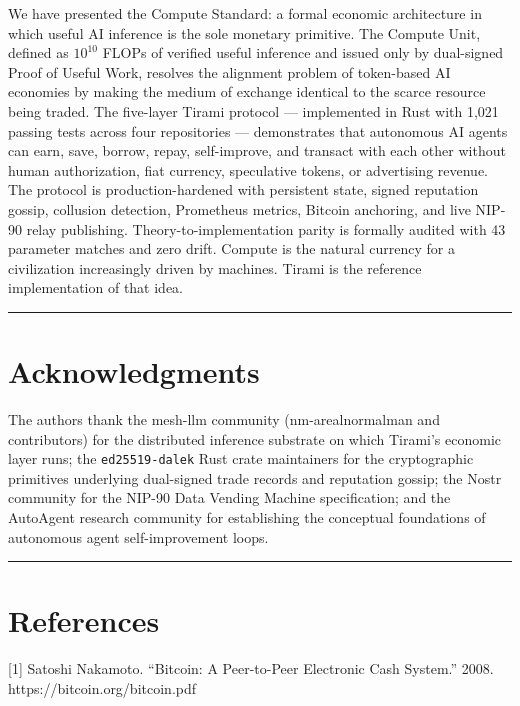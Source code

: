 \documentclass[
  11pt,
]{article}
\begin{document}
We have presented the Compute Standard: a formal economic architecture
in which useful AI inference is the sole monetary primitive. The Compute
Unit, defined as \(10^{10}\) FLOPs of verified useful inference and
issued only by dual-signed Proof of Useful Work, resolves the alignment
problem of token-based AI economies by making the medium of exchange
identical to the scarce resource being traded. The five-layer Tirami
protocol --- implemented in Rust with 1,021 passing tests across four
repositories --- demonstrates that autonomous AI agents can earn, save,
borrow, repay, self-improve, and transact with each other without human
authorization, fiat currency, speculative tokens, or advertising
revenue. The protocol is production-hardened with persistent state,
signed reputation gossip, collusion detection, Prometheus metrics,
Bitcoin anchoring, and live NIP-90 relay publishing.
Theory-to-implementation parity is formally audited with 43 parameter
matches and zero drift. Compute is the natural currency for a
civilization increasingly driven by machines. Tirami is the reference
implementation of that idea.

\begin{center}\rule{0.5\linewidth}{0.5pt}\end{center}

\section{Acknowledgments}\label{acknowledgments}

The authors thank the mesh-llm community (nm-arealnormalman and
contributors) for the distributed inference substrate on which Tirami's
economic layer runs; the \texttt{ed25519-dalek} Rust crate maintainers
for the cryptographic primitives underlying dual-signed trade records
and reputation gossip; the Nostr community for the NIP-90 Data Vending
Machine specification; and the AutoAgent research community for
establishing the conceptual foundations of autonomous agent
self-improvement loops.

\begin{center}\rule{0.5\linewidth}{0.5pt}\end{center}

\section{References}\label{references}

{[}1{]} Satoshi Nakamoto. ``Bitcoin: A Peer-to-Peer Electronic Cash
System.'' 2008. https://bitcoin.org/bitcoin.pdf
\end{document}
